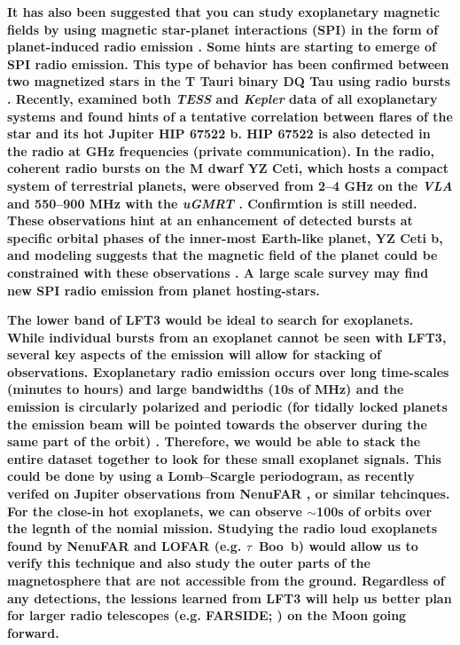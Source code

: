 \textbf{It has also been suggested that you can study exoplanetary magnetic fields by using magnetic star-planet interactions (SPI) in the form of planet-induced radio emission \citep{Cuntz2000,Lanza2009,joe_nature_review}. Some hints are starting to emerge of SPI radio emission. This type of behavior has been confirmed between two magnetized stars in the T Tauri binary DQ Tau using radio bursts \citep{Salter2008}. Recently, \citep{Ilin2022,Ilin2024} examined both \textit{TESS} and \textit{Kepler} data of all exoplanetary systems and found hints of a tentative correlation between flares of the star and its hot Jupiter HIP 67522 b. HIP 67522 is also detected in the radio at GHz frequencies (private communication). In the radio, coherent radio bursts on the M dwarf YZ Ceti, which hosts a compact system of terrestrial planets, were observed from 2--4 GHz on the \textit{VLA} \citep{Pineda2023} and 550--900 MHz with the \textit{uGMRT} \citep{Trigilio2023}. Confirmtion is still needed. These observations hint at an enhancement of detected bursts at specific orbital phases of the inner-most Earth-like planet, YZ Ceti b, and modeling suggests that the magnetic field of the planet could be constrained with these observations \citep{Pineda2023,Trigilio2023}. A large scale survey may find new SPI radio emission from planet hosting-stars.}

\textbf{The lower band of LFT3 would be ideal to search for exoplanets. While individual bursts from an exoplanet cannot be seen with LFT3, several key aspects of the emission will allow for stacking of observations. Exoplanetary radio emission occurs over long time-scales (minutes to hours) and large bandwidths (10s of MHz) and the emission is circularly polarized and periodic (for tidally locked planets the emission beam will be pointed towards the observer during the same part of the orbit) \citep{Zarka2007}. Therefore, we would be able to stack the entire dataset together to look for these small exoplanet signals. This could be done by using a Lomb–Scargle periodogram, as recently verifed on Jupiter observations from NenuFAR \citep{Louis2025}, or similar tehcinques. For the close-in hot exoplanets, we can observe $\sim$100s of orbits over the legnth of the nomial mission. Studying the radio loud exoplanets found by NenuFAR and LOFAR (e.g. $\tau$~Boo~b) would allow us to verify this technique and also study the outer parts of the magnetosphere that are not accessible from the ground. Regardless of any detections, the lessions learned from LFT3 will help us better plan for larger radio telescopes (e.g. FARSIDE; \citealt{Burns2021_RSPTA}) on the Moon going forward. }


